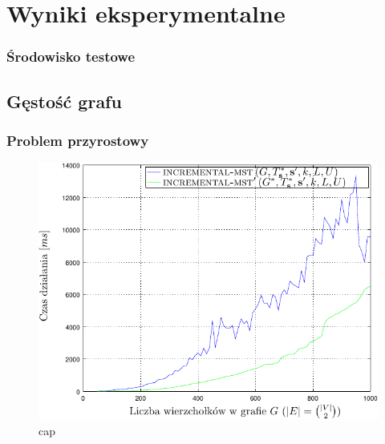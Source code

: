 \chapter{Wyniki eksperymentalne}
\thispagestyle{chapterBeginStyle}



\subsection{Środowisko testowe}



\section{Gęstość grafu}



\subsection{Problem przyrostowy}

\begin{figure}[!htbp]
	\includegraphics[width=\textwidth]{Chapter_VI/IMST1-example/IMST1_psfrag}
	\caption{
		cap
	}
	\label{fig:imst1}
\end{figure}

